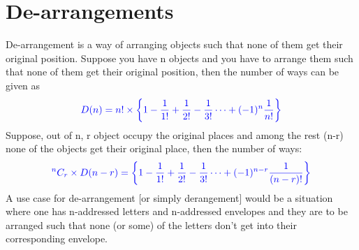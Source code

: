 \documentclass[12pt, a4paper]{article}
\begin{document}
\section{De-arrangements}
De-arrangement is a way of arranging objects such that none of them get their original position. Suppose you have n objects and you have to arrange them such that none of them get their original position, then the number of ways can be given as 
$$\textcolor{blue}{D(n) = n! \times \bigg\{1 - \frac{1}{1!}+\frac{1}{2!}-\frac{1}{3!} \dots + (-1)^n\frac{1}{n!}\bigg\}} $$ 
Suppose, out of n, r object occupy the original places and among the rest (n-r) none of the objects get their original place, then the number of ways:
$$\textcolor{blue}{{^nC_r} \times D(n-r) = \bigg\{1 - \frac{1}{1!}+\frac{1}{2!}-\frac{1}{3!} \dots + (-1)^{n-r}\frac{1}{(n-r)!}\bigg\}}$$
A use case for de-arrangement [or simply derangement] would be a situation where one has n-addressed letters and n-addressed envelopes and they are to be arranged such that none (or some) of the letters don't get into their corresponding envelope.



   
  
\end{document}
